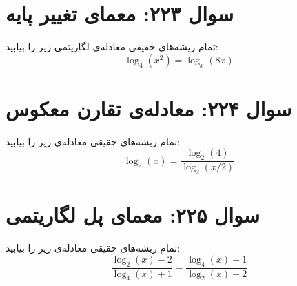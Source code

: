 \documentclass[12pt]{article}
\begin{document}
\section*{سوال ۲۲۳: معمای تغییر پایه}
تمام ریشه‌های حقیقی معادله‌ی لگاریتمی زیر را بیابید:
\begin{displaymath}
	\log_4(x^2) = \log_x(8x)
\end{displaymath}

\vspace{1cm}
\hrulefill
\vspace{1cm}

\section*{سوال ۲۲۴: معادله‌ی تقارن معکوس}
تمام ریشه‌های حقیقی معادله‌ی زیر را بیابید:
\begin{displaymath}
	\log_2(x) = \frac{\log_2(4)}{\log_2(x/2)}
\end{displaymath}

\vspace{1cm}
\hrulefill
\vspace{1cm}

\section*{سوال ۲۲۵: معمای پل لگاریتمی}
تمام ریشه‌های حقیقی معادله‌ی زیر را بیابید:
\begin{displaymath}
	\frac{\log_2(x) - 2}{\log_4(x) + 1} = \frac{\log_4(x) - 1}{\log_2(x) + 2}
\end{displaymath}

\vspace{1cm}
\hrulefill
\vspace{1cm}
\end{document}
